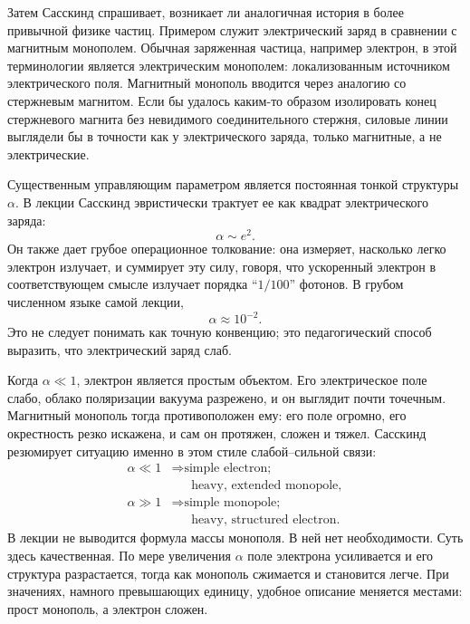 Затем Сасскинд спрашивает, возникает ли аналогичная история в более привычной физике частиц. Примером служит электрический заряд в сравнении с магнитным монополем. Обычная заряженная частица, например электрон, в этой терминологии является электрическим монополем: локализованным источником электрического поля. Магнитный монополь вводится через аналогию со стержневым магнитом. Если бы удалось каким-то образом изолировать конец стержневого магнита без невидимого соединительного стержня, силовые линии выглядели бы в точности как у электрического заряда, только магнитные, а не электрические.

Существенным управляющим параметром является постоянная тонкой структуры \(\alpha\). В лекции Сасскинд эвристически трактует ее как квадрат электрического заряда:
\begin{equation}
\alpha \sim e^2.
\end{equation}
Он также дает грубое операционное толкование: она измеряет, насколько легко электрон излучает, и суммирует эту силу, говоря, что ускоренный электрон в соответствующем смысле излучает порядка ``\(1/100\)'' фотонов. В грубом численном языке самой лекции,
\begin{equation}
\alpha \approx 10^{-2}.
\end{equation}
Это не следует понимать как точную конвенцию; это педагогический способ выразить, что электрический заряд слаб.


Когда \(\alpha\ll 1\), электрон является простым объектом. Его электрическое поле слабо, облако поляризации вакуума разрежено, и он выглядит почти точечным. Магнитный монополь тогда противоположен ему: его поле огромно, его окрестность резко искажена, и сам он протяжен, сложен и тяжел. Сасскинд резюмирует ситуацию именно в этом стиле слабой--сильной связи:
\begin{equation}
\begin{aligned}
\alpha \ll 1
&\Rightarrow \text{simple electron;}\\
&\phantom{\Rightarrow{}}\text{heavy, extended monopole},\\
\alpha \gg 1
&\Rightarrow \text{simple monopole;}\\
&\phantom{\Rightarrow{}}\text{heavy, structured electron}.
\end{aligned}
\end{equation}
В лекции не выводится формула массы монополя. В ней нет необходимости. Суть здесь качественная. По мере увеличения \(\alpha\) поле электрона усиливается и его структура разрастается, тогда как монополь сжимается и становится легче. При значениях, намного превышающих единицу, удобное описание меняется местами: прост монополь, а электрон сложен.

